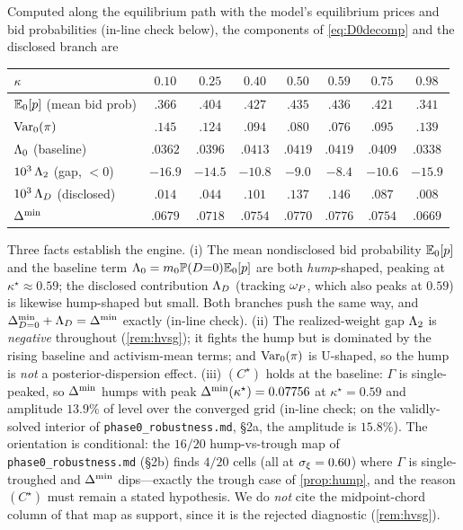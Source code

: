 \begin{remark}
\label{rem:Lambda2-numerics}
Computed along the equilibrium path with the model's equilibrium prices and bid
probabilities (in-line check below), the components of \eqref{eq:D0decomp} and the
disclosed branch are
\begin{center}
\small
\begin{tabular}{lccccccc}
\toprule
$\kappa$ & $0.10$ & $0.25$ & $0.40$ & $0.50$ & $0.59$ & $0.75$ & $0.98$ \\
\midrule
$\mathbb{E}_0[p]$ (mean bid prob)        & $.366$ & $.404$ & $.427$ & $.435$ & $.436$ & $.421$ & $.341$ \\
$\mathrm{Var}_0(\pi)$                    & $.145$ & $.124$ & $.094$ & $.080$ & $.076$ & $.095$ & $.139$ \\
$\Lambda_0$ (baseline)              & $.0362$& $.0396$& $.0413$& $.0419$& $.0419$& $.0409$& $.0338$ \\
$10^3\,\Lambda_2$ (gap, $<0$)       & $-16.9$& $-14.5$& $-10.8$& $-9.0$ & $-8.4$ & $-10.6$& $-15.9$ \\
$10^3\,\Lambda_D$ (disclosed)       & $.014$ & $.044$ & $.101$ & $.137$ & $.146$ & $.087$ & $.008$ \\
$\Delta^{\min}$                          & $.0679$& $.0718$& $.0754$& $.0770$& $.0776$& $.0754$& $.0669$ \\
\bottomrule
\end{tabular}
\end{center}
Three facts establish the engine. (i) The mean nondisclosed bid probability
$\mathbb{E}_0[p]$ and the baseline term $\Lambda_0=m_0\mathbb{P}(D{=}0)\mathbb{E}_0[p]$ are both
\emph{hump}-shaped, peaking at $\kappa^\star\approx0.59$; the disclosed
contribution $\Lambda_D$ (tracking $\omega_P$, which also peaks at $0.59$) is likewise
hump-shaped but small. Both branches push the same way, and
$\Delta^{\min}_{D=0}+\Lambda_D=\Delta^{\min}$ exactly (in-line check). (ii) The realized-weight gap
$\Lambda_2$ is \emph{negative} throughout (\ref{rem:hvsg}); it fights the hump but is
dominated by the rising baseline and activism-mean terms; and $\mathrm{Var}_0(\pi)$ is
U-shaped, so the hump is \emph{not} a posterior-dispersion effect. (iii)
$(C^\star)$ holds at the baseline: $\Gamma$ is single-peaked, so $\Delta^{\min}$ humps
with peak $\Delta^{\min}(\kappa^\star)=0.07756$ at $\kappa^\star=0.59$ and amplitude
$13.9\%$ of level over the converged grid (in-line check; on the validly-solved
interior of \texttt{phase0\_robustness.md}, \S2a, the amplitude is $15.8\%$). The
orientation is conditional: the $16/20$ hump-vs-trough map of
\texttt{phase0\_robustness.md} (\S2b) finds $4/20$ cells (all at $\sigma_\xi=0.60$)
where $\Gamma$ is single-troughed and $\Delta^{\min}$ dips---exactly the trough case of
\ref{prop:hump}, and the reason $(C^\star)$ must remain a stated hypothesis. We do
\emph{not} cite the midpoint-chord column of that map as support, since it is the
rejected diagnostic (\ref{rem:hvsg}).
\end{remark}

